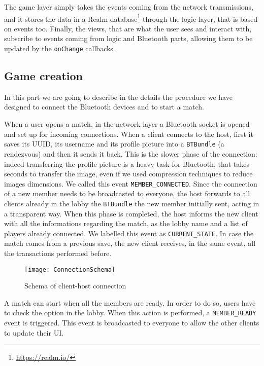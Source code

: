The game layer simply takes the events coming from the network transmissions, 
and it stores the data in a Realm database\footnote{\url{https://realm.io/}} 
through the logic layer, that is based on events too. Finally, the views, that 
are what the user sees and interact with, subscribe to events coming from logic 
and Bluetooth parts, allowing them to be updated by the \texttt{onChange} 
callbacks.

\subsection{Game creation}

In this part we are going to describe in the details the procedure we have 
designed to connect the Bluetooth devices and to start a match.

When a user opens a match, in the network layer a Bluetooth socket is opened 
and set up for incoming connections. When a client connects to the host, 
first it saves its UUID, its username and its profile picture into a 
\texttt{BTBundle} (a rendezvous) and then it sends it back.
This is the slower phase of the connection: indeed transferring the profile 
picture is a heavy task for Bluetooth, that takes seconds to transfer the image, 
even if we used compression techniques to reduce images dimensions. We called 
this event \texttt{MEMBER\_CONNECTED}. Since the connection of a new member 
needs to be broadcasted to everyone, the host forwards to all clients 
already in the lobby the \texttt{BTBundle} the new member initially sent, acting 
in a transparent way. When this phase is completed, the host informs the new 
client with all the informations regarding the match, as the lobby name and a 
list of players already connected. We labelled this event as 
\texttt{CURRENT\_STATE}. In case the match comes from a previous save, the new 
client receives, in the same event, all the transactions performed before.

\begin{figure}[t]
 \centering
 \texttt{[image: ConnectionSchema]}
 \caption{Schema of client-host connection}
 \label{fig:gbConnectionSchema}
\end{figure}

A match can start when all the members are ready. In order to do so, users have 
to check the option in the lobby. When this action is performed, a 
\texttt{MEMBER\_READY} event is triggered. This event is broadcasted to everyone 
to allow the other clients to update their UI.

